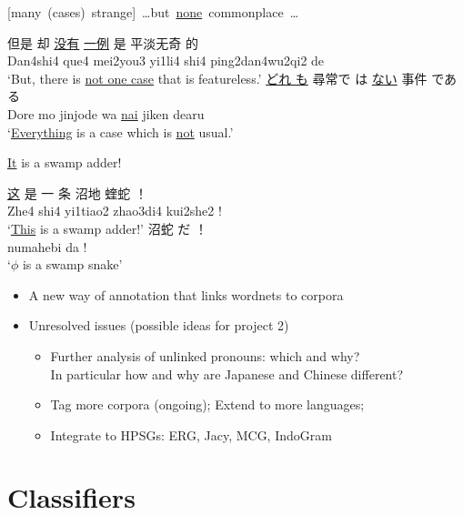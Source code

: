 \documentclass[a4paper,landscape,headrule,footrule,dvips]{foils}
\begin{document}
\begin{CJK}{UTF8}{min}
\begin{exe}
\ex\label{s:none}    \mbox{[many (cases) strange] \ldots but \ul{none} commonplace \ldots}
\begin{xlist}
  \ex \gll      但是    却   \ul{没有}    \ul{一例} 是  平淡无奇      的 \\
  Dan4shi4 que4 mei2you3 yi1li4 shi4 ping2dan4wu2qi2 de \\
  \trans ‘But, there is \ul{not  one case} that is featureless.’
  \ex \gll  \ul{どれ も} 尋常で は \ul{ない} 事件 である \\
  {Dore mo}   jinjode   wa \ul{nai}    jiken dearu \\
  \trans ‘\ul{Everything} is a case which is \ul{not} usual.’
\end{xlist}
  \ex\label{s:dif}  \ul{It} is a swamp adder!
  \begin{xlist}
    \ex \gll \ul{这}     是   一 条      沼地        蝰蛇 ！ \\
    Zhe4 shi4 yi1tiao2 zhao3di4 kui2she2 ! \\
    \trans `\ul{This} is a swamp adder!'
    \ex \gll  沼蛇 だ ！ \\
    numahebi da ! \\
    \trans `\ul{$\phi$} is a swamp snake'
  \end{xlist}
\end{exe}
 

\begin{itemize}
\item A new way of annotation that links wordnets to corpora

\item Unresolved issues (possible ideas for project 2)
  \begin{itemize}
  \item Further analysis of unlinked pronouns: which and why?
    \\ In particular how and why are Japanese and Chinese different?
  \item Tag more corpora (ongoing); Extend to more languages;
  \item Integrate to HPSGs: ERG, Jacy, MCG, IndoGram
  \end{itemize}
\end{itemize}



\section{Classifiers}


\end{CJK}
\end{document}

